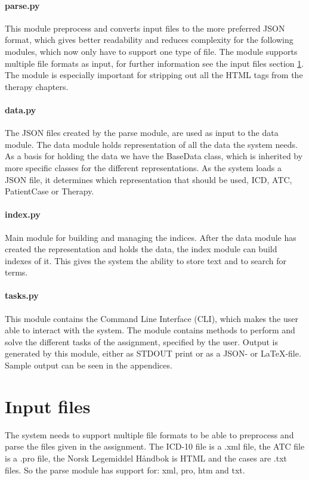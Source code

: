 \paragraph{parse.py}
This module preprocess and converts input files to the more preferred JSON format, which gives better readability and reduces complexity for the following modules, which now only have to support one type of file. The module supports multiple file formats as input, for further information see the input files section \ref{inputfiles}. The module is especially important for stripping out all the HTML tags from the therapy chapters. 

\paragraph{data.py}
The JSON files created by the parse module, are used as input to the data module. The data module holds representation of all the data the system needs. As a basis for holding the data we have the BaseData class, which is inherited by more specific classes for the different representations. As the system loads a JSON file, it determines which representation that should be used, ICD, ATC, PatientCase or Therapy. 

\paragraph{index.py}
Main module for building and managing the indices. After the data module has created the representation and holds the data, the index module can build indexes of it. This gives the system the ability to store text and to search for terms.

\paragraph{tasks.py}
This module contains the Command Line Interface (CLI), which makes the user able to interact with the system. The module contains methods to perform and solve the different tasks of the assignment, specified by the user. Output is generated by this module, either as STDOUT print or as a JSON- or LaTeX-file. Sample output can be seen in the appendices. 


\section{Input files}
\label{inputfiles}
The system needs to support multiple file formats to be able to preprocess and parse the files given in the assignment. The ICD-10 file is a .xml file, the ATC file is a .pro file, the Norsk Legemiddel Håndbok is HTML and the cases are .txt files. So the parse module has support for: xml, pro, htm and txt. 


